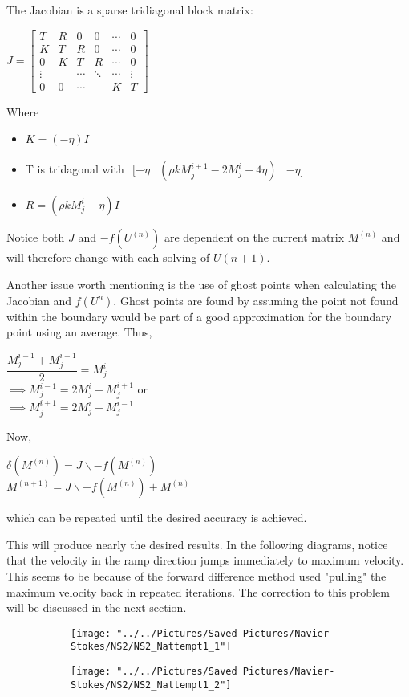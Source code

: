 \documentclass{article}
\begin{document}
The Jacobian is a sparse tridiagonal block matrix:
\begin{center}
$	J=
\begin{bmatrix}
T& R& 0&0& \cdots &0\\
K&T& R& 0 &\cdots& 0\\
0& K& T& R &\cdots&0\\
\vdots& &\cdots& \ddots& \cdots& \vdots\\
0& 0& \cdots&& K& T
\end{bmatrix}$
\end{center}
Where 
\begin{itemize}
\item $K=(-\eta)I$
\item T is tridagonal with 
$\begin{matrix}
[-\eta& (\rho k M^{i+1}_{j}-2M^{i}_{j}+4\eta) &-\eta]
\end{matrix}$
\item $R=(\rho k M^{i}_{j}-\eta)I$
\end{itemize}
Notice both $J$ and $-f(U^{(n)})$ are dependent on the current matrix $M^{(n)}$ and will therefore change with each solving of $U{(n+1)}$.

Another issue worth mentioning is the use of ghost points when calculating the Jacobian and $f(U^{n})$. Ghost points are found by assuming the point not found within the boundary would be part of a good approximation for the boundary point using an average. Thus,
\begin{center}
		$\dfrac {M^{i-1}_{j}+M^{i+1}_{j}}{2}=M^{i}_{j}$\\
		$\implies M^{i-1}_{j}=2M^{i}_{j}-M^{i+1}_{j}$ or\\
		$\implies M^{i+1}_{j}=2M^{i}_{j}-M^{i-1}_{j}$
\end{center}
Now,
\begin{center}
	 $\delta (M^{(n)})=J\backslash -f(M^{(n)})$ \\
	$M^{(n+1)}=J\backslash -f(M^{(n)})+M^{(n)}$
\end{center}
which can be repeated until the desired accuracy is achieved.

This will produce nearly the desired results. In the following diagrams, notice that the velocity in the ramp direction jumps immediately to maximum velocity. This seems to be because of the forward difference method used "pulling" the maximum velocity back in repeated iterations. The correction to this problem will be discussed in the next section.
\begin{figure}[h!]
\begin{subfigure}{0.4\linewidth}
	\centering
	\texttt{[image: "../../Pictures/Saved Pictures/Navier-Stokes/NS2/NS2\_Nattempt1\_1"]}
	\caption{}
	\label{fig:ns2nattempt11}
\end{subfigure}
\begin{subfigure}{0.4\linewidth}
	\centering
	\texttt{[image: "../../Pictures/Saved Pictures/Navier-Stokes/NS2/NS2\_Nattempt1\_2"]}
	\caption{}
	\label{fig:ns2nattempt12}
\end{subfigure}
\end{figure}
\end{document}
